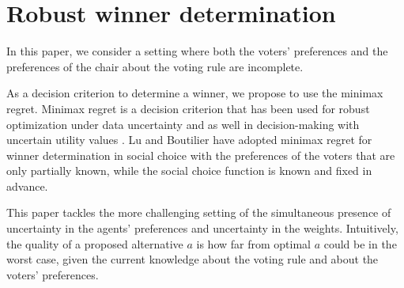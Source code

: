 \documentclass[12pt]{article}
\newcommand{\ppref}{\succ^\text{p}}%
\DeclareMathOperator{\PMR}{PMR}
\DeclareMathOperator{\MR}{MR}
\DeclareMathOperator{\MMR}{MMR}
\begin{document}
% 

\section[Minimax regret under partial profile and weight information]{
Robust winner determination}
\label{sec:mmr}

In this paper, we consider a setting where both the voters' preferences and the preferences of the chair about the voting rule are incomplete.

As a decision criterion to determine a winner, we propose to use the minimax regret. 
Minimax regret \cite{Savage1954} is a decision criterion that has been used for robust optimization under data uncertainty \cite{Kouvelis1997} and as well in decision-making with uncertain utility values  \cite{Salo2001,Boutilier2006}.
Lu and Boutilier \cite{Lu2011} have adopted minimax regret for winner determination in social choice with
the preferences of the voters that are only partially known, while the social choice function is known and fixed in advance.

This paper tackles the more challenging setting of the simultaneous presence of uncertainty in the agents' preferences and uncertainty in the weights.
Intuitively, the quality of a proposed alternative $a$ is how far from optimal $a$  could be in the worst case, given the current knowledge about the voting rule and about the voters' preferences.
\end{document}
